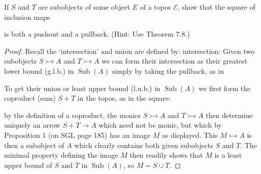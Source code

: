 \documentclass[a4paper]{article}
\DeclareMathOperator{\Sub}{\text {Sub}}
\begin{document}
\begin{question}
    If $S$ and $T$ are subobjects of some object $E$ of a topos $\mathcal E$, show that the square of inclusion maps
    \begin{center}
    \end{center}
    is both a pushout and a pullback. (Hint: Use Theorem 7.8.)
\end{question}
\begin{proof}
    Recall the `intersection' and union are defined by:
    intersection: Given two subobjects $S\rightarrowtail A$ and $T\rightarrowtail A$ we can form their intersection as their greatest lower bound (g.l.b.) in $\Sub(A)$ simply by taking the pullback, as in

    \begin{center}
    \end{center}

    To get their union or least upper bound (l.u.b.) in $\Sub(A)$ we first form the coproduct (sum) $S+T$ in the topos, as in the square:

    \begin{center}
    \end{center}

    by the definition of a coproduct, the monics $S\rightarrowtail A$ and $T\rightarrowtail A$ then determine uniquely an arrow $S+T\to A$ which need not be monic, but which by Proposition 1 (on SGL page 185) has an image $M$ as displayed. This $M\rightarrowtail A$ is then a subobject of $A$ which clearly contains both given subobjects $S$ and $T$. The minimal property defining the image $M$ then readily shows that $M$ is a least upper bound of $S$ and $T$ in $\Sub(A)$, so $M=S\cup T$.


\end{proof}
\end{document}
